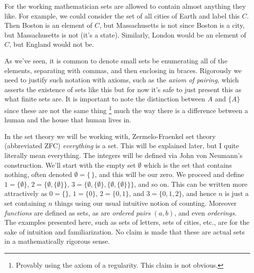         \begin{example}
            For the working mathematician sets are allowed to contain almost
            anything they like. For example, we could consider the set of all
            cities of Earth and label this $C$. Then Boston is an element of
            $C$, but Massachusetts is not since Boston is a city, but
            Massachusetts is not (it's a state). Similarly, London would be an
            element of $C$, but England would not be.
        \end{example}
        As we've seen, it is common to denote small sets be enumerating all of
        the elements, separating with commas, and then enclosing in braces.
        Rigorously we need to justify such notation with axioms, such as the
        \textit{axiom of pairing}, which asserts the existence of sets like this
        but for now it's safe to just present this as what finite sets are. It
        is important to note the distinction between $A$ and $\{A\}$ since these
        are not the same thing%
        \footnote{%
            Provably using the axiom of a regularity. This claim is not obvious.
        }
        much the way there is a difference between a human and the house that
        human lives in.
        \begin{example}
            \label{ex:Everything_is_a_Set}%
            In the set theory we will be working with, Zermelo-Fraenkel set
            theory (abbreviated \gls{ZFC})
            \textit{everything} is a set. This will be explained later, but I
            quite literally mean everything. The integers will be defined via
            John von Neumann's construction. We'll
            start with the empty set $\emptyset$ which is the
            set that contains nothing, often denoted $\emptyset=\{\,\}$, and
            this will be our zero. We proceed and define
            $1=\{\emptyset\}$, $2=\{\emptyset,\{\emptyset\}\}$,
            $3=\{\emptyset,\{\emptyset\},\{\emptyset,\{\emptyset\}\}\}$, and so
            on. This can be written more attractively as $0=\{\}$, $1=\{0\}$,
            $2=\{0,1\}$, and $3=\{0,1,2\}$, and hence $n$ is just a set
            containing $n$ things using our usual intuitive notion of counting.
            Moreover \textit{functions} are defined as sets, as are
            \textit{ordered pairs} $(a,b)$, and even \textit{orderings}. The
            examples presented here, such as sets of letters, sets of cities,
            etc., are for the sake of intuition and familiarization. No claim is
            made that these are actual sets in a mathematically rigorous sense.
        \end{example}
